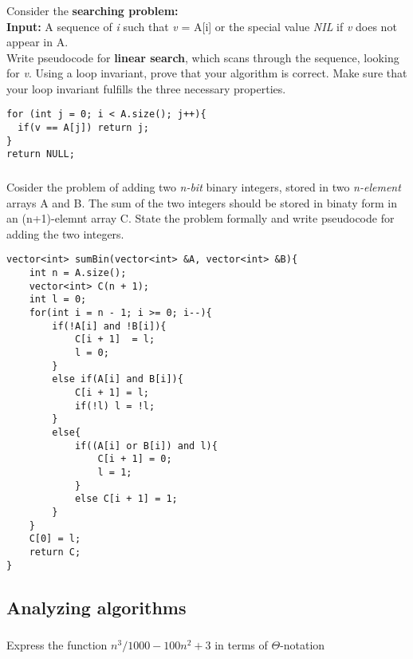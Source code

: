 \documentclass[a4paper,12pt]{article}
\begin{document}
    \subsubsection{} Consider the \textbf{searching problem:} \\
    \textbf{Input: } A sequence of \textit{i} such that \textit{v}
    = A[i] or the special value \textit{NIL} if \textit{v} does not appear in A.\\
    Write pseudocode for \textbf{linear search}, which scans through the sequence, looking
    for \textit{v}. Using a loop invariant, prove that your algorithm is correct. Make sure that
    your loop invariant fulfills the three necessary properties.\\
    
    \begin{lstlisting}
for (int j = 0; i < A.size(); j++){
  if(v == A[j]) return j;
}
return NULL;
    \end{lstlisting}
    
    \subsubsection{} Cosider the problem of adding two \textit{n-bit}
    binary integers, stored in two \textit{n-element} arrays A and B. The sum
     of the two integers should be stored in binaty form in an (n+1)-elemnt array C.
     State the problem formally and write pseudocode for adding the two integers.
     
     \begin{lstlisting}
vector<int> sumBin(vector<int> &A, vector<int> &B){
	int n = A.size();
	vector<int> C(n + 1);
	int l = 0;
	for(int i = n - 1; i >= 0; i--){
		if(!A[i] and !B[i]){
			C[i + 1]  = l;
			l = 0; 
		}
		else if(A[i] and B[i]){
			C[i + 1] = l;
			if(!l) l = !l;
		}
		else{
			if((A[i] or B[i]) and l){
				C[i + 1] = 0;
				l = 1;
			}
			else C[i + 1] = 1;
		}
	}
	C[0] = l;
	return C;
}
     \end{lstlisting}

  \subsection{Analyzing algorithms}
    \subsubsection{} Express the function $n^3/1000-100n^2+3$ in
   terms of $\Theta$-notation \\
   
\end{document}
